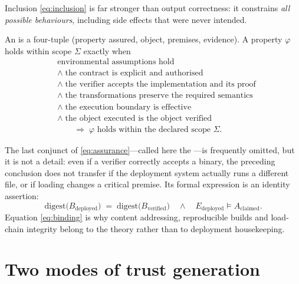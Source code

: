 Inclusion \eqref{eq:inclusion} is far stronger than output correctness: it constrains
\emph{all possible behaviours}, including side effects that were never intended.

\begin{definition}\label{def:assurance}
An  is a four-tuple (property assured, object, premises, evidence). A
property $\varphi$ holds within scope $\Sigma$ exactly when
\begin{equation}\label{eq:assurance}
\begin{aligned}
&\text{environmental assumptions hold} \\
&\land\; \text{the contract is explicit and authorised} \\
&\land\; \text{the verifier accepts the implementation and its proof} \\
&\land\; \text{the transformations preserve the required semantics} \\
&\land\; \text{the execution boundary is effective} \\
&\land\; \text{the object executed is the object verified} \\
&\qquad\Longrightarrow\; \varphi \text{ holds within the declared scope } \Sigma .
\end{aligned}
\end{equation}
\end{definition}

The last conjunct of \eqref{eq:assurance}---called here the ---is frequently
omitted, but it
is not a detail: even if a verifier correctly accepts a binary, the preceding conclusion
does not transfer if the deployment system actually runs a different file, or if loading
changes a critical premise. Its formal expression is an identity assertion:
\begin{equation}\label{eq:binding}
\mathrm{digest}\bigl(B_{\text{deployed}}\bigr) \;=\;
\mathrm{digest}\bigl(B_{\text{verified}}\bigr)
\quad \land \quad
E_{\text{deployed}} \models A_{\text{claimed}} .
\end{equation}
Equation \eqref{eq:binding} is why content addressing, reproducible builds and load-chain
integrity belong to the theory rather than to deployment housekeeping.

\section{Two modes of trust generation}\label{sec:trust}

